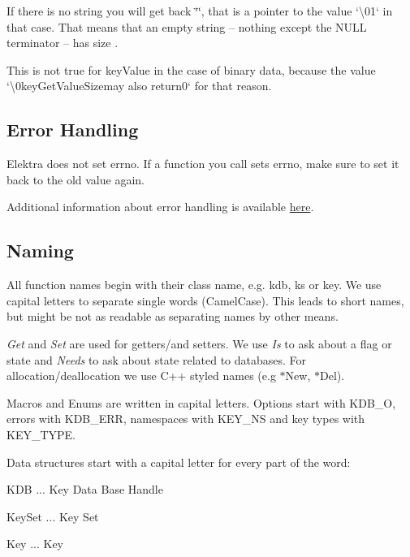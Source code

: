 If there is no string you will get back {\ttfamily \char`\"{}\char`\"{}}, that is a pointer to the value `\textquotesingle{}\textbackslash{}01` in that case. That means that an empty string – nothing except the N\+U\+LL terminator – has size {}.

This is not true for {\ttfamily key\+Value} in the case of binary data, because the value `\textquotesingle{}\textbackslash{}0key\+Get\+Value\+Size{\ttfamily may also return}0` for that reason.

\subsection*{Error Handling}

Elektra does not set {\ttfamily errno}. If a function you call sets {\ttfamily errno}, make sure to set it back to the old value again.

Additional information about error handling is available \hyperlink{doc_dev_error-handling_md}{here}.

\subsection*{Naming}

All function names begin with their class name, e.\+g. {\ttfamily kdb}, {\ttfamily ks} or {\ttfamily key}. We use capital letters to separate single words (Camel\+Case). This leads to short names, but might be not as readable as separating names by other means.

{\itshape Get} and {\itshape Set} are used for getters/and setters. We use {\itshape Is} to ask about a flag or state and {\itshape Needs} to ask about state related to databases. For allocation/deallocation we use C++ styled names (e.\+g {\ttfamily $\ast$\+New}, {\ttfamily $\ast$\+Del}).

Macros and Enums are written in capital letters. Options start with {\ttfamily K\+D\+B\+\_\+O}, errors with {\ttfamily K\+D\+B\+\_\+\+E\+RR}, namespaces with {\ttfamily K\+E\+Y\+\_\+\+NS} and key types with {\ttfamily K\+E\+Y\+\_\+\+T\+Y\+PE}.

Data structures start with a capital letter for every part of the word\+:


\begin{DoxyItemize}
\item {\ttfamily K\+DB} ... Key Data Base Handle
\item {\ttfamily Key\+Set} ... Key Set
\item {\ttfamily Key} ... Key
\end{DoxyItemize}

